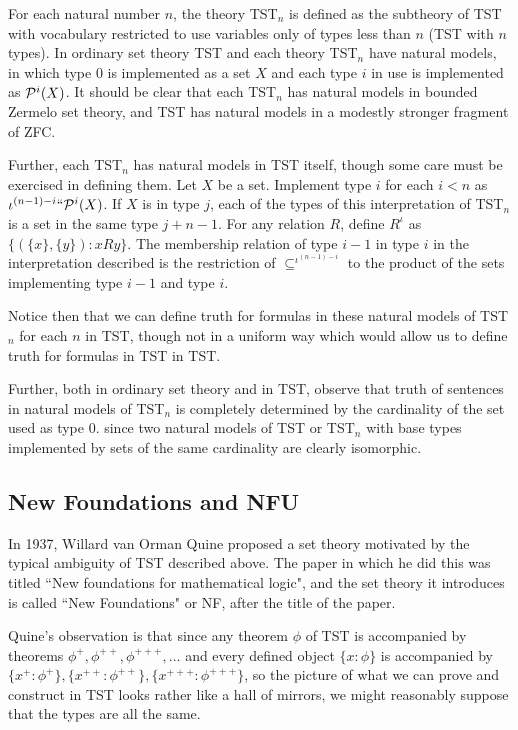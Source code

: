 \documentclass[12pt]{article}
\begin{document}
For each natural number $n$, the theory TST$_n$ is defined as the subtheory of TST with vocabulary restricted to use variables only of types less than $n$ (TST with $n$ types).
In ordinary set theory TST and each theory TST$_n$ have natural models, in which type 0 is implemented as a set $X$ and each type $i$ in use is implemented as ${\cal P}^i(X)$.  It should be clear that each TST$_n$ has natural models in bounded Zermelo set theory, and TST has natural models in a modestly stronger fragment of ZFC.

Further, each TST$_n$ has natural models in TST itself, though some care must be exercised in defining them.  Let $X$ be a set.  Implement type $i$ for each $i<n$ as
$\iota^{(n-1)-i}``{\cal P}^i(X)$.  If $X$ is in type $j$, each of the types of this interpretation of TST$_n$ is a set in the same type $j+n-1$.  For any relation $R$, define
$R^{\iota}$ as $\{(\{x\},\{y\}):x R y\}$.  The membership relation of type $i-1$ in type $i$ in the interpretation described is the restriction of $\subseteq^{\iota^{(n-1)-i}}$ to
the product of the sets implementing type $i-1$ and type $i$.

Notice then that we can define truth for formulas in these natural models of TST$_n$ for each $n$ in TST, though not in a uniform way which would allow us to define truth for formulas
in TST in TST.

Further, both in ordinary set theory and in TST, observe that truth of sentences in natural models of TST$_n$ is completely determined by the cardinality of the set used as type 0.
since two natural models of TST or TST$_n$ with base types implemented by sets of the same cardinality are clearly isomorphic. 

\newpage

\subsection{New Foundations and NFU}

In 1937, Willard van Orman Quine proposed a set theory motivated by the typical ambiguity of TST described above.  The paper in which he did this was titled ``New foundations for mathematical logic", and the set theory it introduces is called ``New Foundations" or NF, after the title of the paper.

Quine's observation is that since any theorem $\phi$ of TST is accompanied by theorems $\phi^+, \phi^{++}, \phi^{+++}, \ldots$ and every defined object $\{x:\phi\}$ is accompanied by
$\{x^+:\phi^+\},\{x^{++}:\phi^{++}\},\{x^{+++}:\phi^{+++}\}$, so the picture of what we can prove and construct in TST looks rather like a hall of mirrors, we might reasonably suppose that the types are all the same.
\end{document}
